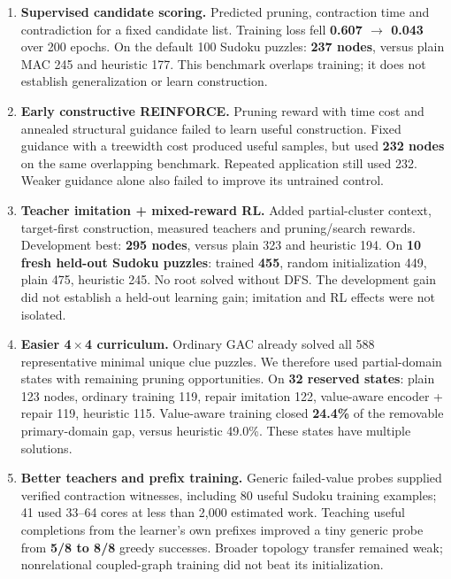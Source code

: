 \documentclass[10pt,a4paper]{article}
\begin{document}
\begin{enumerate}
\item \textbf{Supervised candidate scoring.} Predicted pruning, contraction time and contradiction for a fixed candidate list. Training loss fell \textbf{0.607 $\rightarrow$ 0.043} over 200 epochs. On the default 100 Sudoku puzzles: \textbf{237 nodes}, versus plain MAC 245 and heuristic 177. This benchmark overlaps training; it does not establish generalization or learn construction.

\item \textbf{Early constructive REINFORCE.} Pruning reward with time cost and annealed structural guidance failed to learn useful construction. Fixed guidance with a treewidth cost produced useful samples, but used \textbf{232 nodes} on the same overlapping benchmark. Repeated application still used 232. Weaker guidance alone also failed to improve its untrained control.

\item \textbf{Teacher imitation + mixed-reward RL.} Added partial-cluster context, target-first construction, measured teachers and pruning/search rewards. Development best: \textbf{295 nodes}, versus plain 323 and heuristic 194. On \textbf{10 fresh held-out Sudoku puzzles}: trained \textbf{455}, random initialization 449, plain 475, heuristic 245. No root solved without DFS. The development gain did not establish a held-out learning gain; imitation and RL effects were not isolated.

\item \textbf{Easier 4\,$\times$\,4 curriculum.} Ordinary GAC already solved all 588 representative minimal unique clue puzzles. We therefore used partial-domain states with remaining pruning opportunities. On \textbf{32 reserved states}: plain 123 nodes, ordinary training 119, repair imitation 122, value-aware encoder + repair 119, heuristic 115. Value-aware training closed \textbf{24.4\%} of the removable primary-domain gap, versus heuristic 49.0\%. These states have multiple solutions.

\item \textbf{Better teachers and prefix training.} Generic failed-value probes supplied verified contraction witnesses, including 80 useful Sudoku training examples; 41 used 33--64 cores at less than 2,000 estimated work. Teaching useful completions from the learner's own prefixes improved a tiny generic probe from \textbf{5/8 to 8/8} greedy successes. Broader topology transfer remained weak; nonrelational coupled-graph training did not beat its initialization.


\end{enumerate}
\end{document}
